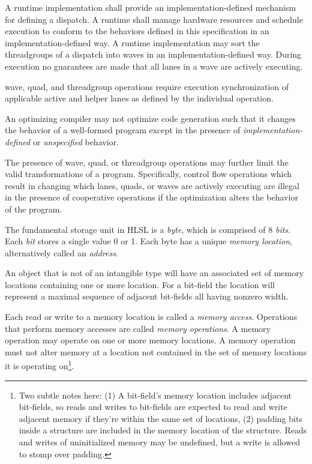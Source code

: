 
\p A runtime implementation shall provide an implementation-defined mechanism
for defining a \gls{dispatch}. A runtime shall manage hardware resources and
schedule execution to conform to the behaviors defined in this specification in
an implementation-defined way. A runtime implementation may sort the
\gls{threadgroup}s of a \gls{dispatch} into \gls{wave}s in an
implementation-defined way. During execution no guarantees are made that all
\gls{lane}s in a \gls{wave} are actively executing.

\p \gls{wave}, \gls{quad}, and \gls{threadgroup} operations require execution
synchronization of applicable active and helper \gls{lane}s as defined by the
individual operation.


\p An optimizing compiler may not optimize code generation such that it changes
the behavior of a well-formed program except in the presence of
\textit{implementation-defined} or \textit{unspecified} behavior.

\p The presence of \gls{wave}, \gls{quad}, or \gls{threadgroup} operations
may further limit the valid transformations of a program. Specifically, control
flow operations which result in changing which \gls{lane}s, \gls{quad}s, or
\gls{wave}s are actively executing are illegal in the presence of cooperative
operations if the optimization alters the behavior of the program.


\p The fundamental storage unit in HLSL is a \textit{byte}, which is comprised
of 8 \textit{bits}. Each \textit{bit} stores a single value 0 or 1. Each byte
has a unique \textit{memory location}, alternatively called an \textit{address}.

\p An object that is not of an intangible type will have an associated set of
memory locations containing one or more location. For a bit-field the location
will represent a maximal sequence of adjacent bit-fields all having nonzero
width.

\p Each read or write to a memory location is called a \textit{memory access}.
Operations that perform memory accesses are called \textit{memory operations}. A
memory operation may operate on one or more memory locations. A memory operation
must not alter memory at a location not contained in the set of memory locations it
is operating on\footnote{Two subtle notes here: (1) A bit-field's memory location
includes adjacent bit-fields, so reads and writes to bit-fields are expected to
read and write adjacent memory if they're within the same set of locations, (2)
padding bits inside a structure are included in the memory location of the
structure. Reads and writes of uninitialized memory may be undefined, but a
write is allowed to stomp over padding.}.

